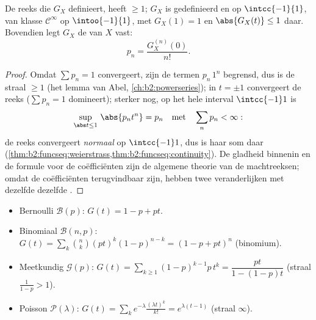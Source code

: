 \begin{proposition}\label{prop:b2:genfun:radius}
De reeks die $G_X$ definieert, heeft  $\geq 1$;
$G_X$ is gedefinieerd en  op $\intcc{-1}{1}$, van klasse
$\mathcal{C}^\infty$ op $\intoo{-1}{1}$, met $G_X(1) = 1$ en
$\abs{G_X(t)} \leq 1$ daar. Bovendien legt $G_X$ de  van
$X$ vast:
\[
p_n = \frac{G_X^{(n)}(0)}{n!} .
\]
\end{proposition}

\begin{proof}
Omdat $\sum p_n = 1$ convergeert, zijn de termen $p_n\,1^n$
begrensd, dus is de straal $\geq 1$ (het lemma van Abel,
\cref{ch:b2:powerseries}); in $t = \pm1$ convergeert de reeks
 ($\sum p_n = 1$ domineert); sterker nog, op het hele
interval $\intcc{-1}1$ is
\[
\sup_{\abs t\leq1}\,\abs{p_nt^n} = p_n
\quad\text{met}\quad \sum_np_n < \infty :
\]
de reeks convergeert \emph{normaal} op $\intcc{-1}1$, dus is haar
som daar 
(\cref{thm:b2:funcseq:weierstrass,thm:b2:funcseq:continuity}). De
gladheid binnenin en de formule voor de coëfficiënten zijn de
algemene theorie van de machtreeksen; omdat de coëfficiënten
terugvindbaar zijn, hebben twee veranderlijken met dezelfde
 dezelfde .
\end{proof}

\begin{example}\label{ex:b2:genfun:classical}
\leavevmode
\begin{itemize}
\item Bernoulli $\mathcal{B}(p)$: $G(t) = 1 - p + pt$.
\item Binomiaal $\mathcal{B}(n, p)$: $G(t) = \sum_k \binom nk
(pt)^k(1-p)^{n-k} = (1 - p + pt)^n$ (binomium).
\item Meetkundig $\mathcal{G}(p)$: $G(t) =
\sum_{k\geq1}(1-p)^{k-1}p\,t^k = \dfrac{pt}{1 - (1-p)t}$ (straal
$\frac{1}{1-p} > 1$).
\item Poisson $\mathcal{P}(\lambda)$: $G(t) = \sum_k
e^{-\lambda}\frac{(\lambda t)^k}{k!} = e^{\lambda(t - 1)}$ (straal
$\infty$).
\end{itemize}
\end{example}

